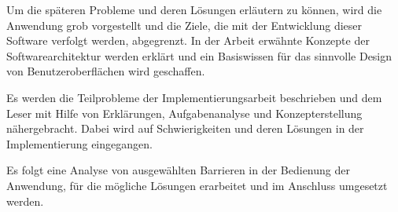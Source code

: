 Um die späteren Probleme und deren Lösungen erläutern zu können, wird die Anwendung grob vorgestellt und die Ziele, die mit der Entwicklung dieser Software verfolgt werden, abgegrenzt. In der Arbeit erwähnte Konzepte der Softwarearchitektur werden erklärt und ein Basiswissen für das sinnvolle Design von Benutzeroberflächen wird geschaffen.

Es werden die Teilprobleme der Implementierungsarbeit beschrieben und dem Leser mit Hilfe von Erklärungen, Aufgabenanalyse und Konzepterstellung nähergebracht. Dabei wird auf Schwierigkeiten und deren Lösungen in der Implementierung eingegangen.

Es folgt eine Analyse von ausgewählten Barrieren in der Bedienung der Anwendung, für die mögliche Lösungen erarbeitet und im Anschluss umgesetzt werden.
